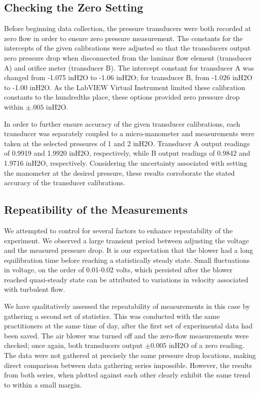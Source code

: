 \documentclass{article}
\begin{document}
\subsection{Checking the Zero Setting}

Before beginning data collection, the pressure transducers were both recorded at zero 
flow in order to ensure zero pressure measurement.  The constants for the intercepts 
of the given calibrations were adjusted so that the transducers output zero pressure 
drop when disconnected from the laminar flow element (transducer A) and orifice meter 
(transducer B).  The intercept constant for transducer A was changed from -1.075 inH2O 
to -1.06 inH2O; for transducer B, from -1.026 inH2O to -1.00 inH2O.  As the LabVIEW 
Virtual Instrument limited these calibration constants to the hundredths place, 
these options provided zero pressure drop within $\pm .005$ inH2O.
 
In order to further ensure accuracy of the given transducer calibrations, each transducer 
was separately coupled to a micro-manometer and measurements were taken at the selected 
pressures of 1 and 2 inH2O.  Transducer A output readings of 0.9919 and 1.9920 inH2O, 
respectively, while B output readings of 0.9842 and 1.9716 inH2O, respectively.  
Considering the uncertainty associated with setting the manometer at the desired 
pressure, these results corroborate the stated accuracy of the transducer calibrations.

\subsection{Repeatibility of the Measurements}

We attempted to control for several factors to enhance repeatability of the experiment. 
We observed a large transient period  between adjusting the voltage and the measured 
pressure drop. It is our expectation that the blower had a long equilibration time 
before reaching a statistically steady state. Small fluctuations in voltage, on 
the order of 0.01-0.02 volts, which persisted after the blower reached 
quasi-steady state can be attributed to variations in velocity associated with turbulent flow. 

We have qualitatively assessed the repeatability of measurements in this case by gathering 
a second set of statistics. This was conducted with the same practitioners at the same time 
of day, after the first set of experimental data had been saved. The air blower was 
turned off and the zero-flow measurements were checked; once again, both transducers 
output $\pm0.005$ inH2O of a zero reading.  The data were not gathered at precisely 
the same pressure drop locations, making direct comparison between data gathering 
series impossible. However, the results from both series, when plotted 
against each other clearly exhibit the same trend to within a small margin. 
\end{document}
